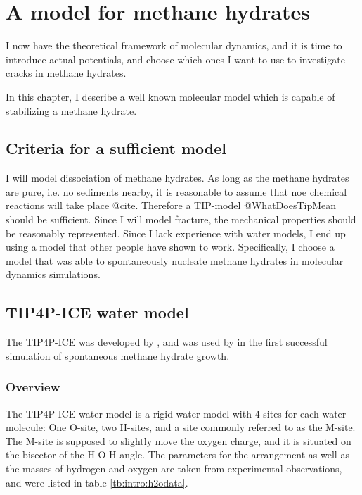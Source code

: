 \chapter{A model for methane hydrates}
I now have the theoretical framework of molecular dynamics, and it is time to introduce actual potentials, and choose which ones I want to use to investigate cracks in methane hydrates.

In this chapter, I describe a well known molecular model which is capable of stabilizing a methane hydrate. 

\section{Criteria for a sufficient model}
I will model dissociation of methane hydrates. As long as the methane hydrates are pure, i.e. no sediments nearby, it is reasonable to assume that noe chemical reactions will take place @cite. Therefore a TIP-model @WhatDoesTipMean should be sufficient. Since I will model fracture, the mechanical properties should be reasonably represented. Since I lack experience with water models, I end up using a model that other people have shown to work. Specifically, I choose a model that was able to spontaneously nucleate methane hydrates in molecular dynamics simulations. 

\section{TIP4P-ICE water model}
The TIP4P-ICE was developed by \cite{Abascal2005}, and was used by \cite{Walsh2009} in the first successful simulation of spontaneous methane hydrate growth.

\subsection{Overview}
The TIP4P-ICE water model is a rigid water model with 4 sites for each water molecule: One O-site, two H-sites, and a site commonly referred to as the M-site. The M-site is supposed to slightly move the oxygen charge, and it is situated on the bisector of the H-O-H angle. The parameters for the arrangement as well as the masses of hydrogen and oxygen are taken from experimental observations, and were listed in table \ref{tb:intro:h2odata}.

